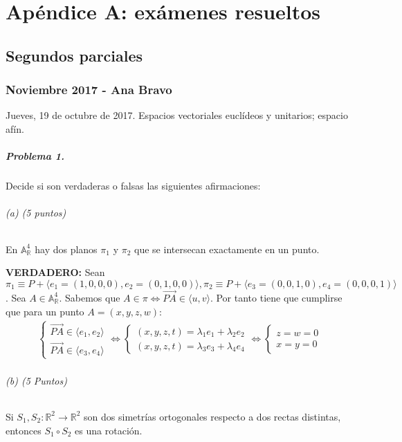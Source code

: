 \documentclass[14pt]{book}
\begin{document}

\chapter{Apéndice A: exámenes resueltos}
\section{Segundos parciales}
\subsection{Noviembre 2017 - Ana Bravo}
Jueves, 19 de octubre de 2017. Espacios vectoriales euclídeos y unitarios; espacio afín.
\paragraph{Problema 1.}
Decide si son verdaderas o falsas las siguientes afirmaciones:

\subparagraph{(a) (5 puntos)} En $\mathbb{A}_\mathbb{R}^4$ hay dos planos $\pi_1$ y  $\pi_2$ que se intersecan exactamente en un punto.

\textbf{VERDADERO:} Sean $\pi_1 \equiv P + \langle e_1 = (1, 0, 0, 0), e_2 = (0, 1, 0, 0) \rangle, \pi_2 \equiv P + \langle e_3 = (0,0,1,0), e_4 = (0,0,0,1) \rangle$. Sea $A \in \mathbb{A}^4_\mathbb{R}$. Sabemos que $A \in \pi \iff \overrightarrow{PA} \in \langle u, v \rangle$. Por tanto tiene que cumplirse que para un punto $A = (x, y, z, w)$:
\begin{align*}
\begin{cases}
	\overrightarrow{PA} \in \langle e_1, e_2 \rangle \\
	\overrightarrow{PA} \in \langle e_3, e_4 \rangle
\end{cases}	\iff
\begin{cases}
(x, y, z, t) = \lambda_1 e_1  + \lambda_2 e_2\\
(x, y, z, t) = \lambda_3 e_3  + \lambda_4 e_4
\end{cases} \iff
\begin{cases}
z = w = 0 \\
x = y = 0
\end{cases}
\end{align*}

\subparagraph{(b) (5 Puntos)} Si $S_1, S_2 : \mathbb{R}^2 \to \mathbb{R}^2$ son dos simetrías ortogonales respecto a dos rectas distintas, entonces $S_1 \circ S_2$ es una rotación.
\end{document}
